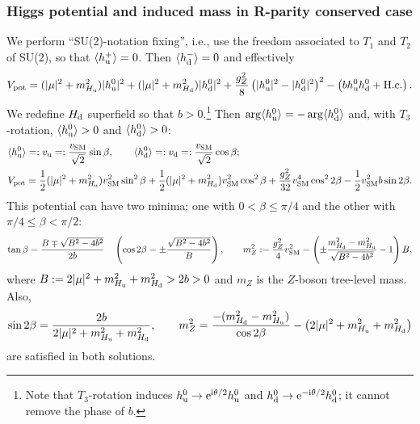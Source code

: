 \documentclass[CheatSheet]{subfiles}
\begin{document}
\subsubsection{Higgs potential and induced mass in  R-parity conserved case}
We perform ``SU(2)-notation fixing'', i.e., use the freedom associated to $T_1$ and $T_2$ of SU(2), so that $\mean{\hup}=0$. Then $\mean{\hdm}=0$ and effectively
\begin{equation}
 V\w{pot}=
   (|\mu|^2 + m^2_{\Hu})  |\huz|^2
 + (|\mu|^2 + m^2_{\Hd}) |\hdz|^2
 + \frac{g_Z^2}{8}\left(|\huz|^2 - |\hdz|^2\right)^2
 - \left(b\huz\hdz +\text{H.c.}\right).
\end{equation}
We redefine $\Hd$ superfield so that $b>0$.\footnote{%
Note that $T_3$-rotation induces $\huz\to\ee^{\ii\theta/2}\huz$ and $\hdz\to\ee^{-\ii\theta/2}\hdz$; it cannot remove the phase of $b$.}
Then $\arg\mean{\huz}=-\arg\mean{\hdz}$ and, with $T_3$-rotation, $\mean{\huz}>0$ and $\mean{\hdz}>0$:
\begin{align}
 &\mean{\huz} =: \vu =: \frac{v\w{SM}}{\sqrt2}\sin\beta,\qquad
 \mean{\hdz} =: \vd =: \frac{v\w{SM}}{\sqrt2}\cos\beta;
\\& V\w{pot}=
   \frac12(|\mu|^2 + m^2_{\Hu})  v\w{SM}^2\sin^2\beta
 + \frac12(|\mu|^2 + m^2_{\Hd}) v\w{SM}^2\cos^2\beta
 + \frac{g_Z^2}{32}v\w{SM}^4\cos^2 2\beta
 - \frac12 v\w{SM}^2 b\sin2\beta.
\end{align}
This potential can have two minima; one with $0<\beta\le\pi/4$ and the other with $\pi/4\le\beta<\pi/2$:
\begin{equation}
 \tan\beta = \frac{B\mp\sqrt{B^2-4b^2}}{2b}
\quad
\left(\cos2\beta = \pm\frac{\sqrt{B^2-4b^2}}{B}\right),
 \qquad
 m_Z^2:=\frac{g_Z^2}{4}v\w{SM}^2 = \left(\pm\frac{m_{\Hd}^2 - m_{\Hu}^2}{\sqrt{B^2-4b^2}}-1\right)B,
\end{equation}
where $B:=2|\mu|^2+m_{\Hu}^2+m_{\Hd}^2>2b>0$ and $m_Z$ is the $Z$-boson tree-level mass.
Also,
\begin{equation}
 \sin2\beta = \frac{2b}{2|\mu|^2 + m_{\Hu}^2 + m_{\Hd}^2},
\qquad
 m_Z^2 = \frac{-(m_{\Hd}^2 - m_{\Hu}^2)}{\cos2\beta} - \left(2|\mu|^2 + m_{\Hu}^2 + m_{\Hd}^2\right)
\end{equation}
are satisfied in both solutions.
\end{document}
